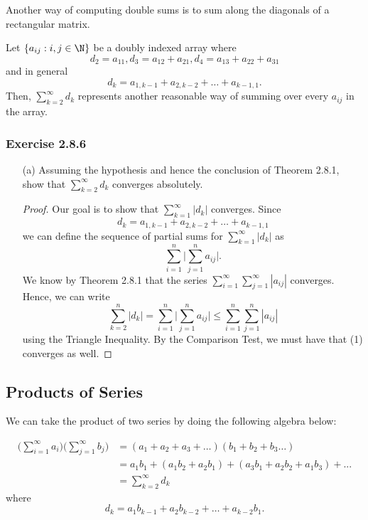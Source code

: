 Another way of computing double sums is to sum along the diagonals of a rectangular matrix.

Let \(  \{ a_{ij} : i,j \in \N  \}  \) be a doubly indexed array where 
\[  d_2 = a_{11}, d_3 = a_{12} + a_{21}, d_4 = a_{13} + a_{22} + a_{31} \]
and in general 
\[  d_k = a_{1,k-1} + a_{2,k-2} + \dots + a_{k-1,1}. \]
Then, \( \sum_{ k=2 }^{ \infty  } d_k  \) represents another reasonable way of summing over every \( a_{ij} \) in the array.

\subsubsection{Exercise 2.8.6}

\begin{enumerate}
    \item[(a)] Assuming the hypothesis and hence the conclusion of Theorem 2.8.1, show that \( \sum_{ k=2 }^{ \infty  } d_k \) converges absolutely. 
        \begin{proof}
        Our goal is to show that \( \sum_{ k=1 }^{ \infty  } | d_k |  \) converges. Since 
        \[  d_k = a_{1,k-1} + a_{2,k-2} + \dots + a_{k-1, 1} \]
        we can define the sequence of partial sums for \( \sum_{ k=1 }^{ \infty  } | d_k |  \) as 
        \[ \sum_{ i=1 }^{ n } \Big| \sum_{ j=1 }^{ n } a_{ij}  \Big| \tag{1}.  \]
        We know by Theorem 2.8.1 that the series \( \sum_{ i=1 }^{ \infty  } \sum_{ j=1 }^{ \infty  } | a_{ij} |  \) converges. Hence, we can write
        \[ \sum_{ k=2 }^{ n } | d_k |  = \sum_{ i=1 }^{ n } \Big| \sum_{ j=1 }^{ n } a_{ij}  \Big| \leq \sum_{ i=1 }^{ n }  \sum_{ j=1 }^{ n } |a_{ij}|  \]
        using the Triangle Inequality. By the Comparison Test, we must have that (1) converges as well. 
        \end{proof}
\end{enumerate}

\subsection{Products of Series}

We can take the product of two series by doing the following algebra below:

\begin{align*}
    \Big( \sum_{ i=1 }^{ \infty  } a_i \Big) \Big( \sum_{ j=1 }^{ \infty  } b_j \Big) &= (a_1 + a_2 + a_3 +  \dots) (b_1 + b_2 + b_3 \dots) \\
                                                                                      &= a_1 b_1 + (a_1 b_2 + a_2 b_1 ) + (a_3 b_1 + a_2 b_2 + a_1 b_3 ) + ...  \\
                                                                                      &= \sum_{ k=2 }^{ \infty  } d_k 
\end{align*}
where 
\[  d_k = a_1 b_{k-1} + a_2 b_{k-2} + \dots + a_{k-2} b_1.\]

